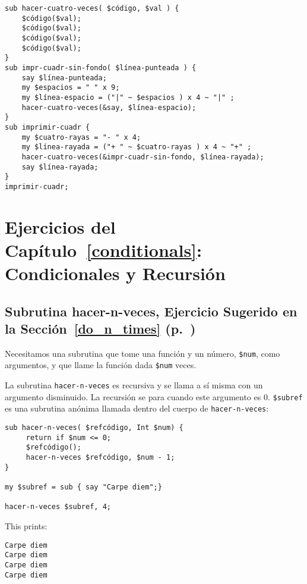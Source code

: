 \begin{verbatim}
sub hacer-cuatro-veces( $código, $val ) {
    $código($val);
    $código($val);
    $código($val);
    $código($val);
}
sub impr-cuadr-sin-fondo( $línea-punteada ) {
    say $línea-punteada;
    my $espacios = " " x 9;
    my $línea-espacio = ("|" ~ $espacios ) x 4 ~ "|" ;
    hacer-cuatro-veces(&say, $línea-espacio);
}
sub imprimir-cuadr {
    my $cuatro-rayas = "- " x 4;
    my $línea-rayada = ("+ " ~ $cuatro-rayas ) x 4 ~ "+" ;
    hacer-cuatro-veces(&impr-cuadr-sin-fondo, $línea-rayada);
    say $línea-rayada;
}
imprimir-cuadr;
\end{verbatim}

\section{Ejercicios del Capítulo~\ref{conditionals}: Condicionales y Recursión}

\label{sol_do_n_times}

\subsection{Subrutina hacer-n-veces, Ejercicio Sugerido en la Sección~\ref{do_n_times} (p.~\pageref{do_n_times})}

Necesitamos una subrutina que tome una función y un número, {\tt \$num},
como argumentos, y que llame la función dada  {\tt \$num} veces.

La subrutina {\tt hacer-n-veces} es recursiva y se llama a sí misma
con un argumento disminuido. La recursión se para cuando este argumento
es 0. \verb|$subref| es una subrutina anónima llamada dentro del cuerpo 
de {\tt hacer-n-veces}:

\begin{verbatim}
sub hacer-n-veces( $refcódigo, Int $num) {
     return if $num <= 0;
     $refcódigo();
     hacer-n-veces $refcódigo, $num - 1;
}

my $subref = sub { say "Carpe diem";}

hacer-n-veces $subref, 4;
\end{verbatim}

This prints:

\begin{verbatim}
Carpe diem
Carpe diem
Carpe diem
Carpe diem
\end{verbatim}


